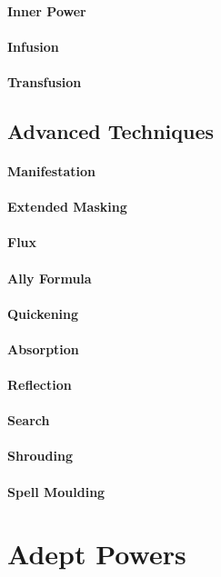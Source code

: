 \paragraph{Inner Power}
\paragraph{Infusion}
\paragraph{Transfusion}


\subsection{Advanced Techniques}
\paragraph{Manifestation}
\paragraph{Extended Masking}
\paragraph{Flux}
\paragraph{Ally Formula}
\paragraph{Quickening}
\paragraph{Absorption}
\paragraph{Reflection}
\paragraph{Search}
\paragraph{Shrouding}
\paragraph{Spell Moulding}




\section{Adept Powers}